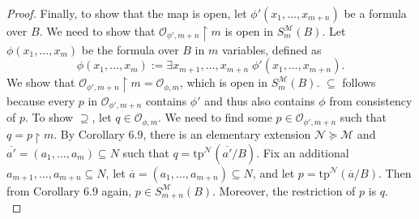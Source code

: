 \documentclass{article}
\begin{document}
\begin{enumerate}[label={\bf Q\arabic*:}]
\begin{enumerate}
\begin{proof}
          Finally, to show that the map is open, let
          $\phi'(x_1,\ldots,x_{m+n})$ be a formula over $B$. We need to
          show that $\mathcal{O}_{\phi',m+n}\restriction m$ is open in
          $S^{\mathcal{M}}_{m}(B)$. Let $\phi(x_1,\ldots,x_m)$ be the
          formula over $B$ in $m$ variables, defined as
          \[\phi(x_1,\ldots,x_m) := \exists x_{m+1},\ldots,x_{m+n}\;
          \phi'(x_1,\ldots,x_{m+n}).\] We show that
          $\mathcal{O}_{\phi',m+n}\restriction m=\mathcal{O}_{\phi,m}$,
          which is open in $S^{\mathcal{M}}_{m}(B)$. $\subseteq$ follows
          because every $p$ in $\mathcal{O}_{\phi',m+n}$ contains $\phi'$
          and thus also contains $\phi$ from consistency of $p$. To show
          $\supseteq$, let $q\in\mathcal{O}_{\phi,m}$. We need to find some
          $p\in\mathcal{O}_{\phi',m+n}$ such that $q=p\restriction m$. By
          Corollary 6.9, there is an elementary extension
          $\mathcal{N}\succeq\mathcal{M}$ and
          $\overline{a'}=(a_1,\ldots,a_m)\subseteq N$ such that
          $q=\text{tp}^\mathcal{N}(\overline{a'}/B)$. Fix an additional
          $a_{m+1},\ldots,a_{m+n}\subseteq N$, let
          $\overline{a}=(a_1,\ldots,a_{m+n})\subseteq N$, and let
          $p=\text{tp}^\mathcal{N}(\overline{a}/B)$. Then from Corollary
          6.9 again, $p\in S^{\mathcal{M}}_{m+n}(B)$. Moreover, the
          restriction of $p$ is $q$. \\
        \end{proof}
    \end{enumerate}
\end{enumerate}
\end{document}
